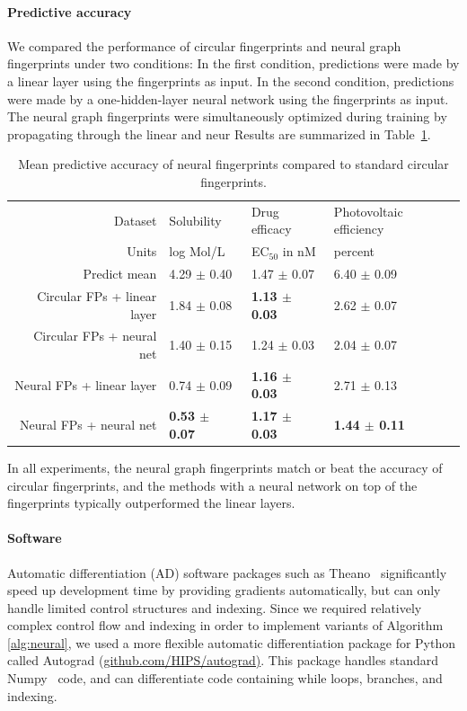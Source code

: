 \documentclass{article}
\newcommand{\citep}{\cite}
\newcommand{\citet}{\cite}
\begin{document}
\paragraph{Predictive accuracy}
We compared the performance of circular fingerprints and neural graph fingerprints under two conditions:
In the first condition, predictions were made by a linear layer using the fingerprints as input.
In the second condition, predictions were made by a one-hidden-layer neural network using the fingerprints as input.
The neural graph fingerprints were simultaneously optimized during training by propagating through the linear and neur
Results are summarized in Table~\ref{table:main results}.
%
\begin{table}
\begin{center}
\begin{tabular}{r|lll}
Dataset                      &   Solubility \citet{delaney_data_2004} & Drug efficacy \citet{gamo2010thousands} & Photovoltaic efficiency \citet{hachmann2011harvard} \\
Units                        &   log Mol/L                            & EC$_{50}$ in nM                        & percent \\
\midrule
Predict mean                 & 4.29 $\pm$ 0.40        & 1.47 $\pm$ 0.07         & 6.40 $\pm$ 0.09 \\
Circular FPs + linear layer  & 1.84 $\pm$ 0.08        & \bf{1.13} $\pm$ 0.03    & 2.62 $\pm$ 0.07 \\
Circular FPs + neural net    & 1.40 $\pm$ 0.15        & 1.24 $\pm$ 0.03         & 2.04 $\pm$ 0.07 \\ 
Neural FPs + linear layer    & 0.74 $\pm$ 0.09        & \bf{1.16} $\pm$ 0.03    & 2.71 $\pm$ 0.13 \\  
Neural FPs + neural net      & \bf{0.53} $\pm$ 0.07   & \bf{1.17} $\pm$ 0.03    & \bf{1.44} $\pm$ 0.11
\end{tabular}
\label{table:main results}
\caption{Mean predictive accuracy of neural fingerprints compared to standard circular fingerprints.}
\end{center}
\end{table}
%
In all experiments, the neural graph fingerprints match or beat the accuracy of circular fingerprints, and the methods with a neural network on top of the fingerprints typically outperformed the linear layers.

\paragraph{Software}
Automatic differentiation (AD) software packages such as Theano~\citep{Bastien-Theano-2012} significantly speed up development time by providing gradients automatically, but can only handle limited control structures and indexing.
Since we required relatively complex control flow and indexing in order to implement variants of Algorithm \ref{alg:neural}, we used a more flexible automatic differentiation package for Python called Autograd (\url{github.com/HIPS/autograd)}.
This package handles standard Numpy~\citep{oliphant2007python} code, and can differentiate code containing while loops, branches, and indexing.
\end{document}
